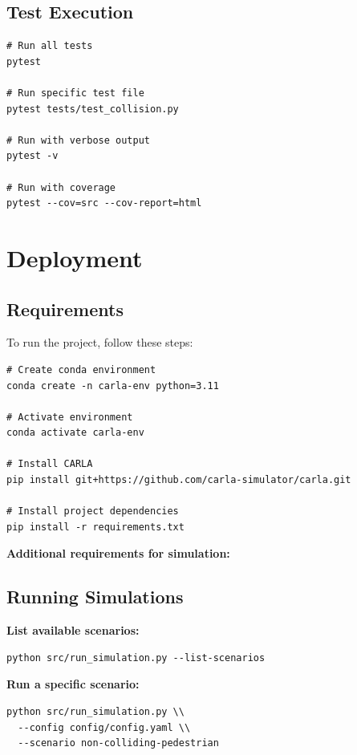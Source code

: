\subsection{Test Execution}

\begin{verbatim}
# Run all tests
pytest

# Run specific test file
pytest tests/test_collision.py

# Run with verbose output
pytest -v

# Run with coverage
pytest --cov=src --cov-report=html
\end{verbatim}

\section{Deployment}

\subsection{Requirements}

To run the project, follow these steps:

\begin{verbatim}
# Create conda environment
conda create -n carla-env python=3.11

# Activate environment
conda activate carla-env

# Install CARLA
pip install git+https://github.com/carla-simulator/carla.git

# Install project dependencies
pip install -r requirements.txt
\end{verbatim}

\textbf{Additional requirements for simulation:}

\subsection{Running Simulations}

\textbf{List available scenarios:}

\begin{verbatim}
python src/run_simulation.py --list-scenarios
\end{verbatim}

\textbf{Run a specific scenario:}

\begin{verbatim}
python src/run_simulation.py \\
  --config config/config.yaml \\
  --scenario non-colliding-pedestrian
\end{verbatim}


